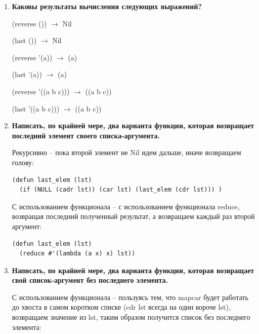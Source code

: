 \documentclass[a4paper,14pt]{extreport} %
\begin{document}
\begin{enumerate}
(cons lst1 lst2) $\to$ ((1 2 3) 4 5)

(list lst1 lst2) $\to$ ((1 2 3) (4 5))

(append lst1 lst2) $\to$ (1 2 3 4 5)

CONS -- позволяет создавать списки (возвращает бинарную ячейку (точечная пара, список), расставляя указатели, обязательно 2 аргумента). 

APPEND -- функция двух аргументов x и y, сцепляющая два списка в один.

LIST -- создает столько списковых ячеек, сколько аргументов (всегда возвращает список).

\item \textbf{Каковы результаты вычисления следующих выражений?}

(reverse ()) $\to$ Nil

(last ()) $\to$ Nil

(reverse '(a)) $\to$ (a)

(last '(a)) $\to$ (a)

(reverse '((a b c))) $\to$ ((a b c))

(last '((a b c))) $\to$ ((a b c))

\item \textbf{Написать, по крайней мере, два варианта функции, которая возвращает последний элемент своего списка-аргумента.}

Рекурсивно -- пока второй элемент не Nil идем дальше, иначе возвращаем голову:

\begin{lstlisting}
(defun last_elem (lst)
  (if (NULL (cadr lst)) (car lst) (last_elem (cdr lst))) )
\end{lstlisting}

С использованием функционала -- с использованием функционала reduce, возвращая последний полученный результат, а возвращаем каждый раз второй аргумент:

\begin{lstlisting}
(defun last_elem (lst)
  (reduce #'(lambda (a x) x) lst))
\end{lstlisting}

\item \textbf{Написать, по крайней мере, два варианта функции, которая возвращает свой список-аргумент без последнего элемента.}

С использованием функционала -- пользуясь тем, что mapcar будет работать до хвоста в самом коротком списке (cdr lst всегда на один короче lst), возвращаем значение из lst, таким образом получится список без последнего элемента:


\end{enumerate}
\end{document}
